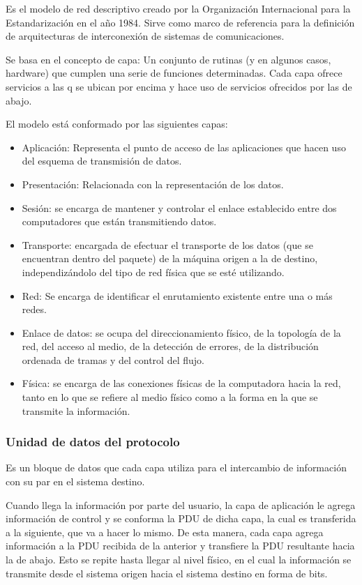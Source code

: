 Es el modelo de red descriptivo creado por la Organización Internacional para la Estandarización en el año 1984. Sirve como marco de referencia para la definición de arquitecturas de interconexión de sistemas de comunicaciones.

Se basa en el concepto de capa: Un conjunto de rutinas (y en algunos casos, hardware) que cumplen una serie de funciones determinadas. Cada capa ofrece servicios a las q se ubican por encima y hace uso de servicios ofrecidos por las de abajo.

El modelo está conformado por las siguientes capas:

\begin{itemize}
	\item Aplicación: Representa el punto de acceso de las aplicaciones que hacen uso del esquema de transmisión de datos.
	\item Presentación: Relacionada con la representación de los datos.
	\item Sesión: se encarga de mantener y controlar el enlace establecido entre dos computadores que están transmitiendo datos.
	\item Transporte: encargada de efectuar el transporte de los datos (que se encuentran dentro del paquete) de la máquina origen a la de destino, independizándolo del tipo de red física que se esté utilizando.
	\item Red: Se encarga de identificar el enrutamiento existente entre una o más redes.
	\item Enlace de datos: se ocupa del direccionamiento físico, de la topología de la red, del acceso al medio, de la detección de errores, de la distribución ordenada de tramas y del control del flujo.
	\item Física: se encarga de las conexiones físicas de la computadora hacia la red, tanto en lo que se refiere al medio físico como a la forma en la que se transmite la información.
\end{itemize}

\subsubsection{Unidad de datos del protocolo}

Es un bloque de datos que cada capa utiliza para el intercambio de información con su par en el sistema destino. 

Cuando llega la información por parte del usuario, la capa de aplicación le agrega información de control y se conforma la PDU de dicha capa, la cual es transferida a la siguiente, que va a hacer lo mismo. De esta manera, cada capa agrega información a la PDU recibida de la anterior y transfiere la PDU resultante hacia la de abajo. Esto se repite hasta llegar al nivel físico, en el cual la información se transmite desde el sistema origen hacia el sistema destino en forma de bits.

